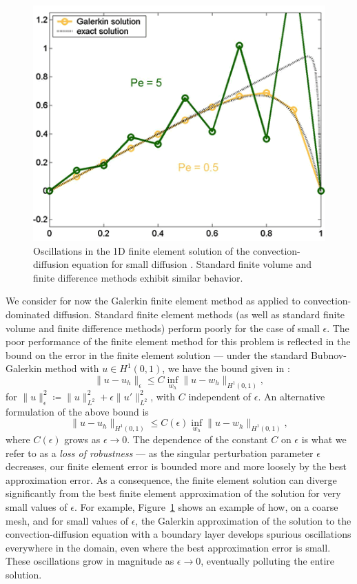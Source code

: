 \begin{figure}[!h]
\centering
\includegraphics[scale=.4]{figs/GalerkinOscTight.png}
\caption{Oscillations in the 1D finite element solution of the convection-diffusion equation for small diffusion \cite{GalerkinOsc}. Standard finite volume and finite difference methods exhibit similar behavior.}
\label{fig:GalerkinOsc}
\end{figure}
We consider for now the Galerkin finite element method as applied to convection-dominated diffusion.  Standard finite element methods (as well as standard finite volume and finite difference methods) perform poorly for the case of small $\epsilon$.  The poor performance of the finite element method for this problem is reflected in the bound on the error in the finite element solution --- under the standard Bubnov-Galerkin method with $u\in H^1(0,1)$, we have the bound given in \cite{roos2008robust}:
\[
\|u-u_h\|_\epsilon \leq C \inf_{w_h}\|u-w_h\|_{H^1(0,1)},
\]
for $\|u\|_\epsilon^2 \coloneqq \|u\|_{L^2}^2 + \epsilon \|u'\|_{L^2}^2$, with $C$ independent of $\epsilon$. An alternative formulation of the above bound is 
\[
\|u-u_h\|_{H^1(0,1)} \leq C(\epsilon) \inf_{w_h}\|u-w_h\|_{H^1(0,1)},
\]
where $C(\epsilon)$ grows as $\epsilon\rightarrow 0$. The dependence of the constant $C$ on $\epsilon$ is what we refer to as a \textit{loss of robustness} --- as the singular perturbation parameter $\epsilon$ decreases, our finite element error is bounded more and more loosely by the best approximation error.  As a consequence, the finite element solution can diverge significantly from the best finite element approximation of the solution for very small values of $\epsilon$.  For example, Figure~\ref{fig:GalerkinOsc} shows an example of how, on a coarse mesh, and for small values of $\epsilon$, the Galerkin approximation of the solution to the convection-diffusion equation with a boundary layer develops spurious oscillations everywhere in the domain, even where the best approximation error is small.  These oscillations grow in magnitude as $\epsilon \rightarrow 0$, eventually polluting the entire solution.  

